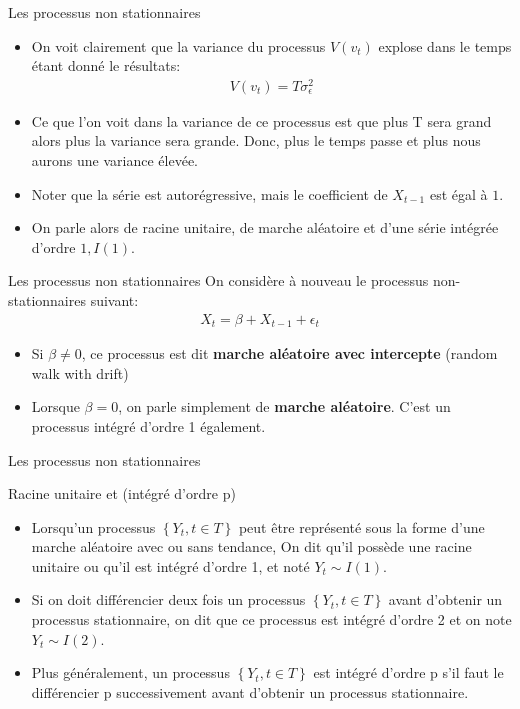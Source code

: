 \documentclass{beamer}
\begin{document}
\begin{frame}{{Les processus non stationnaires}}
\begin{itemize}
\item On voit clairement que la variance du processus $V(v_t)$ explose dans le temps étant donné le résultats:
\begin{align*}
V(v_t)=T\sigma_{\epsilon}^2
\end{align*}
\item Ce que l’on voit dans la variance de ce processus est que plus T sera grand alors plus la variance sera grande. Donc, plus le temps passe et plus nous aurons une variance élevée.
\item Noter que la série est autorégressive, mais le coefficient de $X_{t-1}$ est égal à $1$. 
\item On parle alors de racine unitaire, de marche aléatoire et d’une série intégrée d’ordre $1, I(1)$.

\end{itemize}
\end{frame}

\begin{frame}{{Les processus non stationnaires}}
On considère à nouveau le processus non-stationnaires suivant:
\begin{align*}
X_t=\beta+X_{t-1}+\epsilon_t
\end{align*}
\begin{itemize}
\item Si $\beta \neq 0$, ce processus est dit \textbf{marche aléatoire avec intercepte} (random walk with drift) 
\item Lorsque $\beta = 0$, on parle simplement de \textbf{marche aléatoire}. C’est un processus intégré d’ordre 1 également.
\end{itemize}
\end{frame}

\begin{frame}{{Les processus non stationnaires}}
\begin{block}{Racine unitaire et (intégré d’ordre p)}
\begin{itemize}
\item Lorsqu’un processus $\left\{Y_t, t \in T \right\}$ peut être représenté sous la forme d’une marche aléatoire avec ou sans tendance, On dit qu’il possède une racine unitaire ou qu’il est intégré d’ordre 1, et noté $Y_t \sim I(1)$.
\item Si on doit différencier deux fois un processus $\left\{Y_t, t \in T \right\}$ avant d’obtenir un processus stationnaire, on dit que ce processus est intégré d’ordre 2 et on note $Y_t \sim I(2)$.
\item Plus généralement, un processus $\left\{Y_t, t \in T \right\}$ est intégré d’ordre p s’il faut le différencier p successivement avant d’obtenir un processus stationnaire.
\end{itemize}
\end{block}
\end{frame}
\end{document}
